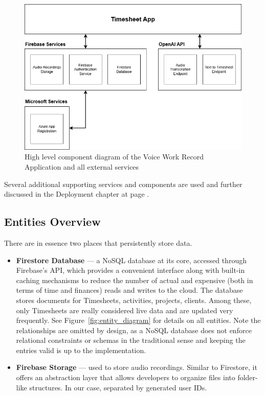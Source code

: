 \documentclass[
  digital,     %
  oneside,     %
  nosansbold,  %
  nocolorbold, %
  lof,         %
  lot,         %
]{fithesis4}
\begin{document}
\begin{figure}[ht]
    \centering
    \includegraphics[width=\textwidth]{assets/diagrams/timesheet_app_component_diagram.drawio.png}
    \caption{High level component diagram of the Voice Work Record Application and all external services}
    \label{fig:timesheet_app_architecture}
\end{figure}

Several additional supporting services and components are used and further discussed in the Deployment chapter at page \pageref{chap:deployment}.

\subsection{Entities Overview}

There are in essence two places that persistently store data.

\begin{itemize}
    \item \textbf{Firestore Database} --- a \acrshort{NoSQL} database at its core, accessed through Firebase's \gls{API}, which provides a convenient interface along with built-in caching mechanisms to reduce the number of actual and expensive (both in terms of time and finances) reads and writes to the cloud. The database stores documents for Timesheets, activities, projects, clients. Among these, only Timesheets are really considered live data and are updated very frequently. See Figure~\ref{fig:entity_diagram} for details on all entities. Note the relationships are omitted by design, as a \acrshort{NoSQL} database does not enforce relational constraints or schemas in the traditional sense and keeping the entries valid is up to the implementation.
    \item \textbf{Firebase Storage} --- used to store audio recordings. Similar to Firestore, it offers an abstraction layer that allows developers to organize files into folder-like structures. In our case, separated by generated user IDs.
\end{itemize}
\end{document}
